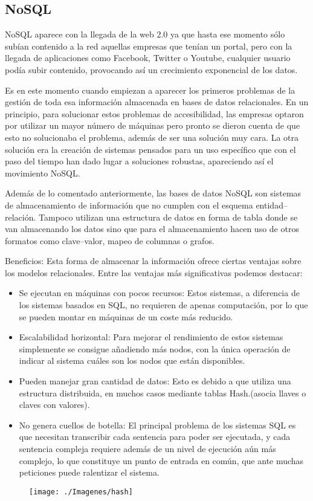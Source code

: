 \documentclass[%
 reprint,
 amsmath,amssymb,
 aps,
]{revtex4-1}
\begin{document}
\subsection{NoSQL}
\par NoSQL aparece con la llegada de la web 2.0 ya que hasta ese momento sólo subían contenido a la red aquellas empresas que tenían un portal, pero con la llegada de aplicaciones como Facebook, Twitter o Youtube, cualquier usuario podía subir contenido, provocando así un crecimiento exponencial de los datos.

\par Es en este momento cuando empiezan a aparecer los primeros problemas de la gestión de toda esa información almacenada en bases de datos relacionales. En un principio, para solucionar estos problemas de accesibilidad, las empresas optaron por utilizar un mayor número de máquinas pero pronto se dieron cuenta de que esto no solucionaba el problema, además de ser una solución muy cara. La otra solución era la creación de sistemas pensados para un uso específico que con el paso del tiempo han dado lugar a soluciones robustas, apareciendo así el movimiento NoSQL. 
\par Además de lo comentado anteriormente, las bases de datos NoSQL son sistemas de almacenamiento de información que no cumplen con el esquema entidad–relación. Tampoco utilizan una estructura de datos en forma de tabla donde se van almacenando los datos sino que para el almacenamiento hacen uso de otros formatos como clave–valor, mapeo de columnas o grafos.


\par Beneficios:
	Esta forma de almacenar la información ofrece ciertas ventajas sobre los modelos relacionales. Entre las ventajas más significativas podemos destacar:
	\begin{itemize}
		\item Se ejecutan en máquinas con pocos recursos: Estos sistemas, a diferencia de los sistemas basados en SQL, no requieren de apenas computación, por lo que se pueden montar en máquinas de un coste más reducido.
		\item Escalabilidad horizontal: Para mejorar el rendimiento de estos sistemas simplemente se consigue añadiendo más nodos, con la única operación de indicar al sistema cuáles son los nodos que están disponibles.
		\item Pueden manejar gran cantidad de datos: Esto es debido a que utiliza una estructura distribuida, en muchos casos mediante tablas Hash.(asocia llaves o claves con valores).\cite{hash}
		\item No genera cuellos de botella: El principal problema de los sistemas SQL es que necesitan transcribir cada sentencia para poder ser ejecutada, y cada sentencia compleja requiere además de un nivel de ejecución aún más complejo, lo que constituye un punto de entrada en común, que ante muchas peticiones puede ralentizar el sistema. \cite{acens}
	\end{itemize}
	\begin{figure}[htb]
	\begin{center}
	\texttt{[image: ./Imagenes/hash]}
	\end{center}
	\end{figure}
\end{document}
